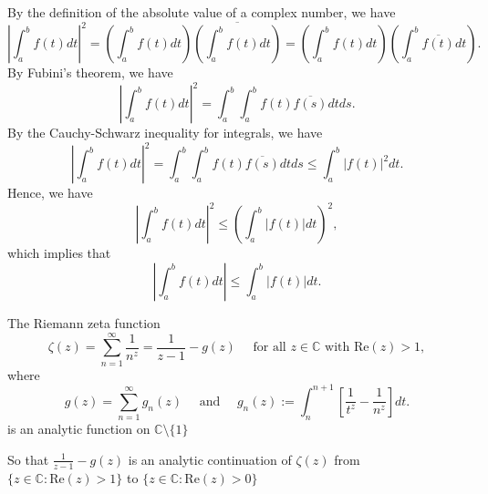 \documentclass{elegantbook}
\begin{document}
\begin{solution}
  By the definition of the absolute value of a complex number, we have
  \[
    \left|\int_{a}^{b} f(t) dt\right|^2 = \left( \int_{a}^{b} f(t) dt \right) \overline{\left( \int_{a}^{b} f(t) dt \right)} = \left( \int_{a}^{b} f(t) dt \right) \left( \int_{a}^{b} \overline{f(t)} dt \right).
  \]
  By Fubini's theorem, we have
  \[
    \left|\int_{a}^{b} f(t) dt\right|^2 = \int_{a}^{b} \int_{a}^{b} f(t)\overline{f(s)} dt ds.
  \]
  By the Cauchy-Schwarz inequality for integrals, we have
  \[
    \left|\int_{a}^{b} f(t) dt\right|^2 = \int_{a}^{b} \int_{a}^{b} f(t)\overline{f(s)} dt ds \leq \int_{a}^{b} |f(t)|^2 dt.
  \]
  Hence, we have
  \[
    \left|\int_{a}^{b} f(t) dt\right|^2 \leq \left( \int_{a}^{b} |f(t)| dt\right)^2,
  \]
  which implies that
  \[
    \left|\int_{a}^{b} f(t) dt\right| \leq \int_{a}^{b} |f(t)| dt.
  \]
\end{solution}


\begin{theorem} \label{thm:analytic_continuation_of_riemann_zeta_function}
  The Riemann zeta function
  \[
    \zeta(z) = \sum_{n=1}^{\infty} \frac{1}{n^z} = \frac{1}{z-1} - g(z) \quad \text{ for all } z\in\mathbb{C} \text{ with } \mathrm{Re}(z) > 1,
  \]
  where
  \[
    g(z) = \sum_{n=1}^{\infty} g_n(z) \quad \text{ and } \quad g_n(z) := \int_{n}^{n+1} \left[ \frac{1}{t^z} - \frac{1}{n^z} \right] dt.
  \]
  is an analytic function on $\mathbb{C}\setminus\{1\}$

  So that $\frac{1}{z-1} - g(z)$ is an analytic continuation of $\zeta(z)$ from $\{z\in\mathbb{C} : \mathrm{Re}(z) > 1\}$ to $\{z\in\mathbb{C} : \mathrm{Re}(z) > 0\}$
\end{theorem}
\end{document}
